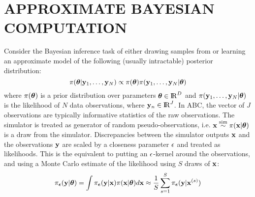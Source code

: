 \documentclass[]{article}
\begin{document}
\section{APPROXIMATE BAYESIAN COMPUTATION}\label{sec:abcmcmc}
Consider the Bayesian inference task of either drawing samples from or learning an approximate model of the following (usually intractable) posterior distribution:
\begin{equation}
  \pi({\bm \theta} | {\bf y}_1, \ldots, {\bf y}_N ) \propto \pi({\bm \theta}) \pi( {\bf y}_1, \ldots, {\bf y}_N  | {\bm \theta} )
\end{equation}
where $\pi({\bm \theta})$ is a prior distribution over parameters ${\bm \theta} \in {\rm I\!R}^{D}$ and $\pi( {\bf y}_1, \ldots, {\bf y}_N  | {\bm \theta} )$ is the likelihood of $N$ data observations, where ${\bf y}_n \in {\rm I\!R}^J$.  In ABC, the vector of $J$ observations are typically informative statistics of the raw observations.  
  The simulator is treated as generator of random pseudo-observations, i.e. ${\bf x} \overset{\operatorname{sim}}{\sim} \pi( {\bf x} | {\bm \theta} )$ is a draw from the simulator.  Discrepancies between the simulator outputs ${\bf x}$ and the observations ${\bf y}$ are scaled by a closeness parameter $\epsilon$ and treated as likelihoods.  This is the equivalent to putting an $\epsilon$-kernel around the observations, and using a Monte Carlo estimate of the likelihood using $S$ draws of ${\bf x}$: 
\begin{equation}
  \pi_{{\bm {\epsilon}}}( {\bf y} | {\bm \theta} ) =  \int \pi_{{\bm {\epsilon}}}({\bf y} | {\bf x} ) \pi( {\bf x} | {\bm \theta} ) d{\bf x} 
                           \approx  \frac{1}{S} \sum_{s=1}^S \pi_{{\bm {\epsilon}}}({\bf y} | {\bf x}^{(s)} ) \label{eq:abc_mc_approx}
\end{equation}
\end{document}
